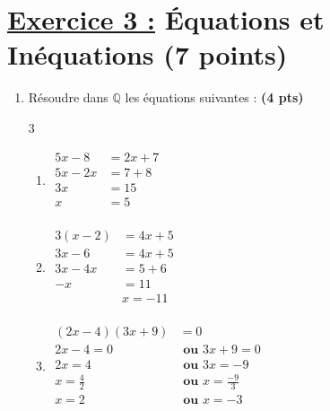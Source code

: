 \documentclass[12pt,a4paper]{article}
\begin{document}
\section*{\underline{Exercice 3 :} Équations et Inéquations (7 points)}
\begin{enumerate}
    \item Résoudre dans $\mathbb{Q}$ les équations suivantes : \textbf{(4 pts)}

\begin{multicols}{3}
\setlength{\columnseprule}{0.1mm}
\begin{enumerate}
\item[]
\(
\begin{aligned}
5x - 8 &= 2x + 7\\
5x - 2x &= 7 + 8\\
3x &= 15\\
x &= 5\\
\end{aligned}
\)
\item[]
\(
\begin{aligned}
3(x - 2) &= 4x + 5\\
3x - 6 &= 4x + 5\\
3x - 4x &= 5 + 6\\
-x &= 11 \\ 
&x = -11\\
\end{aligned}
\)
\item[]
\(
\begin{aligned}
(2x - 4)(3x + 9) &= 0\\
2x - 4 = 0 &\textbf{ ou } 3x + 9 = 0\\
2x = 4 &\textbf{ ou } 3x = -9\\
x = \frac{4}{2} &\textbf{ ou } x = \frac{-9}{3}\\
x = 2 &\textbf{ ou } x = -3\\
\end{aligned}
\)
\end{enumerate}
\end{multicols}    
    

\end{enumerate}
\end{document}
